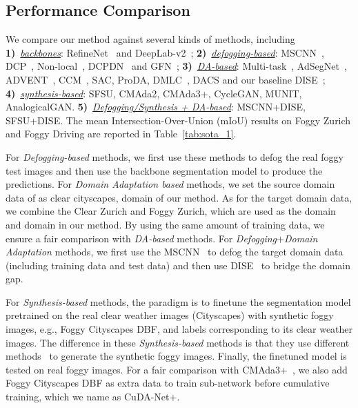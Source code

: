 \documentclass[10pt,twocolumn,letterpaper]{article}
\begin{document}
\subsection{Performance Comparison}

We compare our method against several kinds of methods, including
\textbf{1)}~\underline{\emph{backbones}}: RefineNet~\cite{lin2017refinenet} and DeepLab-v2~\cite{chen2017deeplab}; 
\textbf{2)}~\underline{\emph{defogging-based}}: MSCNN~\cite{ren2016single}, DCP~\cite{he2010single}, Non-local~\cite{berman2016non}, DCPDN~\cite{zhang2018densely} and GFN~\cite{ren2018gated};
\textbf{3)}~\underline{\emph{DA-based}}: Multi-task~\cite{alshammari2020competitive}, AdSegNet~\cite{tsai2018learning}, ADVENT~\cite{vu2019advent}, CCM~\cite{li2020content}, SAC\cite{araslanov2021self}, ProDA\cite{zhang2021prototypical}, DMLC~\cite{guo2021metacorrection}, DACS\cite{tranheden2021dacs} and our baseline DISE~\cite{chang2019all}; 
\textbf{4)}~\underline{\emph{synthesis-based}}: SFSU\cite{sakaridis2018semantic}, CMAda2\cite{sakaridis2018model}, CMAda3+\cite{dai2020curriculum}, CycleGAN\cite{zhu2017unpaired}, MUNIT\cite{huang2018multimodal}, AnalogicalGAN\cite{gong2021analogical}. 
\textbf{5)}~\underline{\emph{Defogging/Synthesis + DA-based}}: MSCNN+DISE, SFSU+DISE.
The mean Intersection-Over-Union (mIoU) results on Foggy Zurich and Foggy Driving are reported in Table~\ref{tab:sota_1}.

For \emph{Defogging-based} methods, we first use these methods to defog the real foggy test images and then use the backbone segmentation model to produce the predictions.
For \emph{Domain Adaptation based} methods, we set the source domain data of as clear cityscapes,  domain of our method. As for the target domain data, we combine the Clear Zurich and Foggy Zurich, which are used as the  domain and  domain in our method. 
By using the same amount of training data, we ensure a fair comparison with \emph{DA-based} methods.
For \emph{Defogging}+\emph{Domain Adaptation} methods, we first use the MSCNN~\cite{ren2016single} to defog the target domain data (including training data and test data) and then use DISE~\cite{chang2019all} to bridge the domain gap.

For \emph{Synthesis-based} methods, the paradigm is to finetune the segmentation model pretrained on the real clear weather images (Cityscapes) with synthetic foggy images, e.g., Foggy Cityscapes DBF, and labels corresponding to its clear weather images. The difference in these \emph{Synthesis-based} methods is that they use different methods~\cite{sakaridis2018semantic,sakaridis2018model,gong2021analogical,zhu2017unpaired,huang2018multimodal} to generate the synthetic foggy images. Finally, the finetuned model is tested on real foggy images.
For a fair comparison with CMAda3+~\cite{dai2020curriculum}, we also add Foggy Cityscapes DBF as extra data to train sub-network  before cumulative training, which we name as CuDA-Net+.
\end{document}
